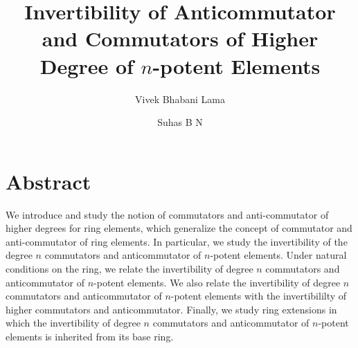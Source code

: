 \documentclass[12pt]{amsart}
\title{Invertibility of Anticommutator and Commutators of Higher Degree of $n$-potent Elements}
\author{Vivek Bhabani Lama}
\author{Suhas B N }
\date{}
\theoremstyle{definition}
\numberwithin{equation}{section}
\begin{document}
\maketitle






 
\section*{Abstract}
We introduce and study the notion of commutators and anti-commutator of higher degrees for ring elements, which generalize the concept of commutator and anti-commutator of ring elements. In particular, we study the invertibility of the degree $n$ commutators and anticommutator of $n$-potent elements. Under natural conditions on the ring, we relate the invertibility of degree $n$ commutators and anticommutator of $n$-potent elements. We also relate the invertibility of degree $n$ commutators and anticommutator of $n$-potent elements with the invertibililty of higher commutators and anticommutator. Finally, we study ring extensions in which the invertibility of degree $n$ commutators and anticommutator of $n$-potent elements is inherited from its base ring. 
\end{document}
